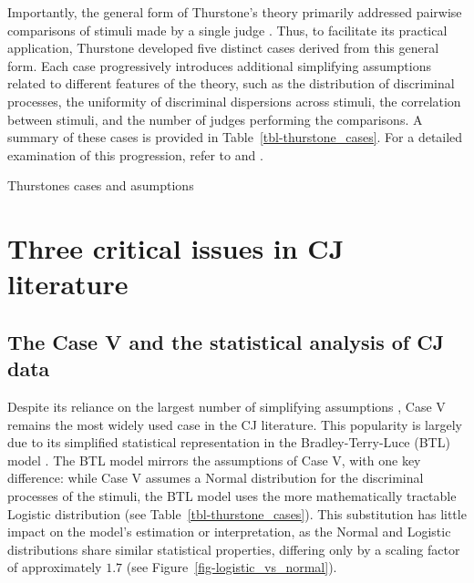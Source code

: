\documentclass[
  authoryear,
  preprint,
  1p]{elsarticle}
\begin{document}
Importantly, the general form of Thurstone's theory primarily addressed
pairwise comparisons of stimuli made by a single judge
\citep[pp.~267]{Thurstone_1927b}. Thus, to facilitate its practical
application, Thurstone developed five distinct cases derived from this
general form. Each case progressively introduces additional simplifying
assumptions related to different features of the theory, such as the
distribution of discriminal processes, the uniformity of discriminal
dispersions across stimuli, the correlation between stimuli, and the
number of judges performing the comparisons. A summary of these cases is
provided in Table~\ref{tbl-thurstone_cases}. For a detailed examination
of this progression, refer to \citet{Thurstone_1927b} and
\citet[pp.~248-253]{Bramley_2008}.

\begin{table}

\caption{\label{tbl-thurstone_cases}Thurstones cases and asumptions}


\end{table}%

\section{Three critical issues in CJ
literature}\label{sec-theory-issues}

\subsection{The Case V and the statistical analysis of CJ
data}\label{sec-theory-issue1}

Despite its reliance on the largest number of simplifying assumptions
\citetext{\citealp[pp.~253]{Bramley_2008}; \citealp[pp.~677]{Kelly_et_al_2022}},
Case V remains the most widely used case in the CJ literature. This
popularity is largely due to its simplified statistical representation
in the Bradley-Terry-Luce (BTL) model
\citep{Bradley_et_al_1952, Luce_1959}. The BTL model mirrors the
assumptions of Case V, with one key difference: while Case V assumes a
Normal distribution for the discriminal processes of the stimuli, the
BTL model uses the more mathematically tractable Logistic distribution
\citep[pp.~254]{Andrich_1978, Bramley_2008} (see
Table~\ref{tbl-thurstone_cases}). This substitution has little impact on
the model's estimation or interpretation, as the Normal and Logistic
distributions share similar statistical properties, differing only by a
scaling factor of approximately \(1.7\)
\citep[pp.~16]{vanderLinden_et_al_2017_I} (see
Figure~\ref{fig-logistic_vs_normal}).
\end{document}
